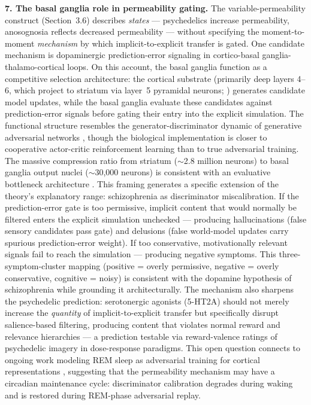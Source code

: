 \documentclass[12pt]{article}
\begin{document}
\textbf{7. The basal ganglia role in permeability gating.} The variable-permeability construct (Section~3.6) describes \emph{states} --- psychedelics increase permeability, anosognosia reflects decreased permeability --- without specifying the moment-to-moment \emph{mechanism} by which implicit-to-explicit transfer is gated. One candidate mechanism is dopaminergic prediction-error signaling in cortico-basal ganglia-thalamo-cortical loops. On this account, the basal ganglia function as a competitive selection architecture: the cortical substrate (primarily deep layers 4--6, which project to striatum via layer~5 pyramidal neurons; \citealp{Shepherd2011}) generates candidate model updates, while the basal ganglia evaluate these candidates against prediction-error signals before gating their entry into the explicit simulation. The functional structure resembles the generator-discriminator dynamic of generative adversarial networks \citep{Gershman2019}, though the biological implementation is closer to cooperative actor-critic reinforcement learning than to true adversarial training. The massive compression ratio from striatum ($\sim$2.8 million neurons) to basal ganglia output nuclei ($\sim$30,000 neurons) is consistent with an evaluative bottleneck architecture \citep{BenjaminKording2023}. This framing generates a specific extension of the theory's explanatory range: schizophrenia as discriminator miscalibration. If the prediction-error gate is too permissive, implicit content that would normally be filtered enters the explicit simulation unchecked --- producing hallucinations (false sensory candidates pass gate) and delusions (false world-model updates carry spurious prediction-error weight). If too conservative, motivationally relevant signals fail to reach the simulation --- producing negative symptoms. This three-symptom-cluster mapping (positive = overly permissive, negative = overly conservative, cognitive = noisy) is consistent with the dopamine hypothesis of schizophrenia \citep{HowesKapur2009} while grounding it architecturally. The mechanism also sharpens the psychedelic prediction: serotonergic agonists (5-HT2A) should not merely increase the \emph{quantity} of implicit-to-explicit transfer but specifically disrupt salience-based filtering, producing content that violates normal reward and relevance hierarchies --- a prediction testable via reward-valence ratings of psychedelic imagery in dose-response paradigms. This open question connects to ongoing work modeling REM sleep as adversarial training for cortical representations \citep{Deperrois2022}, suggesting that the permeability mechanism may have a circadian maintenance cycle: discriminator calibration degrades during waking and is restored during REM-phase adversarial replay.
\end{document}

